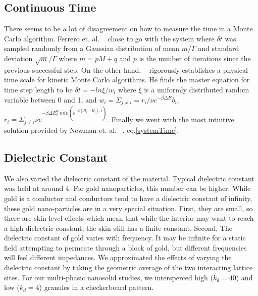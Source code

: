 \subsection{Continuous Time}
There seems to be a lot of disagreement on how to measure the time in a Monte Carlo algorithm. Ferrero et. al. ~\cite{Ferrero14} chose to go with the system where $\delta t$ was sampled randomly from a Gaussian distribution of mean $m/ \Gamma$ and standard deviation $\sqrt{m}/\Gamma$ where $m = p M + q$ and $p$ is the number of iterations since the previous successful step. On the other hand, ~\cite{Serebrinsky11} rigorously establishes a physical time scale for kinetic Monte Carlo algorithms. He finds the master equation for time step length to be $\delta t = -ln{\xi} / w_i$ where $\xi$ is a uniformly distributed random variable between 0 and 1, and $w_i = \Sigma_{j \neq i} = r_i / \nu e^{-\beta \Delta E} b_i$, $r_i = \Sigma_{j \neq i} \nu e^{-\beta \Delta E^m_0 min(e^{-\beta (H_j - H_i ),1 })}$. Finally we went with the most intuitive solution provided by Newman et. al. ~\cite{Newman99}, eq.\ref{systemTime}. 

\subsection{Dielectric Constant}
We also varied the dielectric constant of the material. Typical dielectric constant was held at around 4. For gold nanoparticles, this number can be higher. While gold is a conductor and conductors tend to have a dielectric constant of infinity, these gold nano-particles are in a very special situation. First, they are small, so there are skin-level effects which mean that while the interior may want to reach a high dielectric constant, the skin still has a finite constant. Second, The dielectric constant of gold varies with frequency. It may be infinite for a static field attempting to permeate through a block of gold, but different frequencies will feel different impedances. We approximated the effects of varying the dielectric constant by taking the geometric average of the two interacting lattice sites. For our multi-phasic nanosolid studies, we intersperced high ($k_d = 40$) and low ($k_d = 4$) granules in a checkerboard pattern. 

